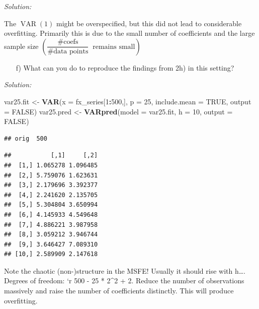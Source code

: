 \documentclass[12pt,a4paper]{article}
\newcommand{\VAR}{\operatorname{VAR}} %
\newenvironment{Shaded}{\begin{snugshade}}{\end{snugshade}}
\newcommand{\DataTypeTok}[1]{\textcolor[rgb]{0.13,0.29,0.53}{#1}}
\newcommand{\DecValTok}[1]{\textcolor[rgb]{0.00,0.00,0.81}{#1}}
\newcommand{\KeywordTok}[1]{\textcolor[rgb]{0.13,0.29,0.53}{\textbf{#1}}}
\newcommand{\NormalTok}[1]{#1}
\newcommand{\OperatorTok}[1]{\textcolor[rgb]{0.81,0.36,0.00}{\textbf{#1}}}
\newcommand{\OtherTok}[1]{\textcolor[rgb]{0.56,0.35,0.01}{#1}}
\newcommand{\StringTok}[1]{\textcolor[rgb]{0.31,0.60,0.02}{#1}}
\begin{document}
\emph{Solution:}

The \(\VAR(1)\) might be overspecified, but this did not lead to
considerable overfitting. Primarily this is due to the small number of
coefficients and the large sample size
\(\left( \dfrac{\# \text{coefs}}{\# \text{data points}} \; \; \text{remains small}\right)\)

\begin{itemize}
  \item[f)]  What can you do to reproduce the findings from 2h) in this setting?
\end{itemize}

\emph{Solution:}

\begin{Shaded}
\begin{Highlighting}[]
\NormalTok{var25.fit <-}\StringTok{ }\KeywordTok{VAR}\NormalTok{(}\DataTypeTok{x =}\NormalTok{ fx_series[}\DecValTok{1}\OperatorTok{:}\DecValTok{500}\NormalTok{,], }\DataTypeTok{p =} \DecValTok{25}\NormalTok{, }\DataTypeTok{include.mean =} \OtherTok{TRUE}\NormalTok{, }\DataTypeTok{output =} \OtherTok{FALSE}\NormalTok{)}
\NormalTok{var25.pred <-}\StringTok{ }\KeywordTok{VARpred}\NormalTok{(}\DataTypeTok{model =}\NormalTok{ var25.fit, }\DataTypeTok{h =} \DecValTok{10}\NormalTok{, }\DataTypeTok{output =} \OtherTok{FALSE}\NormalTok{)}
\end{Highlighting}
\end{Shaded}

\begin{verbatim}
## orig  500
\end{verbatim}

\begin{Shaded}
\end{Shaded}

\begin{verbatim}
##           [,1]     [,2]
##  [1,] 1.065278 1.096485
##  [2,] 5.759076 1.623631
##  [3,] 2.179696 3.392377
##  [4,] 2.241620 2.135705
##  [5,] 5.304804 3.650994
##  [6,] 4.145933 4.549648
##  [7,] 4.886221 3.987958
##  [8,] 3.059212 3.946744
##  [9,] 3.646427 7.089310
## [10,] 2.589909 2.147618
\end{verbatim}

Note the chaotic (non-)structure in the MSFE! Usually it should rise
with h\ldots. Degrees of freedom: `r 500 - 25 * 2\^{}2 + 2. Reduce the
number of observations massively and raise the number of coefficients
distinctly. This will produce overfitting.
\end{document}
